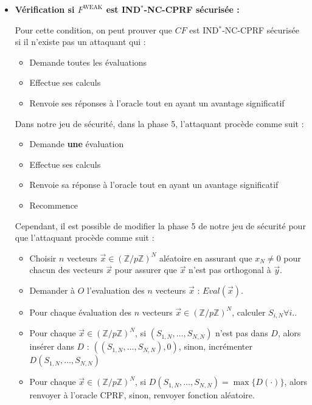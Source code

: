 \documentclass[9pt]{extarticle}
\begin{document}
\begin{itemize}
On dit que $P$ est non programmable si $P.Prog$ ne met pas à jour $\sigma_P$ et l'exécution de $P.Ls$ sur différentes entrées ne change pas la distribution de sa sortie.

Dans notre implémentation de $F^{\text{WEAK}}$, nous utilisons le lazy sampling pour implémenter la fonction de hachage $H$. Ceci implique que $Eval_H(\vec{x}) = H(S \cdot \vec{x})$ est fixé uniquement lorsque l'évaluation de $\vec{x}$ est demandée, mais pas plus tôt.

On peut donc conclure que $P$ est non-programmable.

\item \textbf{Vérification si $F^{\text{WEAK}}$ est IND$^*$-NC-CPRF sécurisée :}

Pour cette condition, on peut prouver que $CF$ est IND$^*$-NC-CPRF sécurisée si il n'existe pas un attaquant qui :

\begin{itemize}
  \item Demande toutes les évaluations
  \item Effectue ses calculs
  \item Renvoie ses réponses à l'oracle tout en ayant un avantage significatif
\end{itemize}

Dans notre jeu de sécurité, dans la phase 5, l'attaquant procède comme suit : 

\begin{itemize}
  \item Demande \textbf{une} évaluation
  \item Effectue ses calculs
  \item Renvoie sa réponse à l'oracle tout en ayant un avantage significatif
  \item Recommence
\end{itemize}

Cependant, il est possible de modifier la phase 5 de notre jeu de sécurité pour que l'attaquant procède comme suit : 

\begin{itemize}
  \item Choisir $n$ vecteurs $\vec{x} \in (\mathbb{Z}/p\mathbb{Z})^N$ aléatoire en assurant que $x_N \neq 0$ pour chacun des vecteurs $\vec{x}$ pour assurer que $\vec{x}$ n'est pas orthogonal à $\vec{y}$.
  \item Demander à $O$ l'evaluation des $n$ vecteurs $\vec{x}$ : $Eval(\vec{x})$.
  \item Pour chaque évaluation des $n$ vecteurs $\vec{x} \in (\mathbb{Z}/p\mathbb{Z})^N$, calculer $S_{i,N} \forall i$..
  \item Pour chaque $\vec{x} \in (\mathbb{Z}/p\mathbb{Z})^N$, si $(S_{1,N},\ldots,S_{N,N})$ n'est pas dans $D$, alors insérer dans $D$ : $( (S_{1,N},\ldots,S_{N,N}), 0)$, sinon, incrémenter $D(S_{1,N},\ldots,S_{N,N})$
  \item Pour chaque $\vec{x} \in (\mathbb{Z}/p\mathbb{Z})^N$, si $D(S_{1,N},\ldots,S_{N,N}) = \max\{D(\cdot)\}$, alors renvoyer à l'oracle CPRF, sinon, renvoyer fonction aléatoire.
\end{itemize}


\end{itemize}
\end{document}
